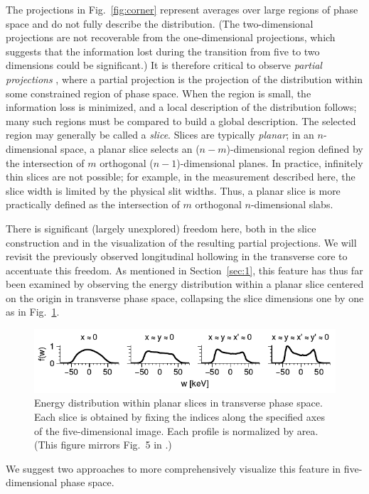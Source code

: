 \documentclass[%
 reprint,
 amsmath,amssymb,
 aps,
prstab,
]{revtex4-2}
\begin{document}
The projections in Fig.~\ref{fig:corner} represent averages over large regions of phase space and do not fully describe the distribution. (The two-dimensional projections are not recoverable from the one-dimensional projections, which suggests that the information lost during the transition from five to two dimensions could be significant.) It is therefore critical to observe \textit{partial projections} \cite{Cathey2018, Ruisard2020}, where a partial projection is the projection of the distribution within some constrained region of phase space. When the region is small, the information loss is minimized, and a local description of the distribution follows; many such regions must be compared to build a global description. The selected region may generally be called a \textit{slice}. Slices are typically \textit{planar}; in an $n$-dimensional space, a planar slice selects an ($n - m$)-dimensional region defined by the intersection of $m$ orthogonal ($n - 1$)-dimensional planes. In practice, infinitely thin slices are not possible; for example, in the measurement described here, the slice width is limited by the physical slit widths. Thus, a planar slice is more practically defined as the intersection of $m$ orthogonal $n$-dimensional slabs.

There is significant (largely unexplored) freedom here, both in the slice construction and in the visualization of the resulting partial projections. We will revisit the previously observed longitudinal hollowing in the transverse core to accentuate this freedom. As mentioned in Section~\ref{sec:1}, this feature has thus far been examined by observing the energy distribution within a planar slice centered on the origin in transverse phase space, collapsing the slice dimensions one by one as in Fig.~\ref{fig:hollow_energy_a}.
%
\begin{figure}
    \centering
    \includegraphics[width=\columnwidth]{fig3.pdf}
    \caption{Energy distribution within planar slices in transverse phase space. Each slice is obtained by fixing the indices along the specified axes of the five-dimensional image. Each profile is normalized by area. (This figure mirrors Fig.~5 in \cite{Cathey2018}.)}
    \label{fig:hollow_energy_a}
\end{figure}
%
We suggest two approaches to more comprehensively visualize this feature in five-dimensional phase space. 
\end{document}
